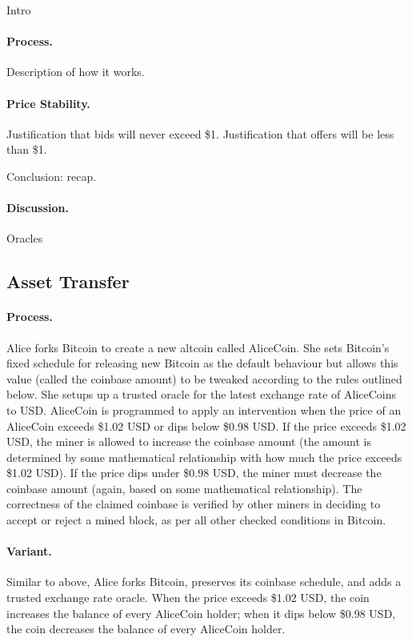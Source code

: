 Intro

\paragraph{Process.} Description of how it works.

\paragraph{Price Stability.} Justification that bids will never exceed \$1. Justification that offers will be less than \$1.

Conclusion: recap.

\paragraph{Discussion.} Oracles


\subsection{Asset Transfer}
\label{sec:basecoin}


\paragraph{Process.} Alice forks Bitcoin to create a new altcoin called AliceCoin. She sets Bitcoin's fixed schedule for releasing new Bitcoin as the default behaviour but allows this value (called the coinbase amount) to be tweaked according to the rules outlined below. She setups up a trusted oracle for the latest exchange rate of AliceCoins to USD. AliceCoin is programmed to apply an intervention when the price of an AliceCoin exceeds \$1.02 USD or dips below \$0.98 USD. If the price exceeds \$1.02 USD, the miner is allowed to increase the coinbase amount (the amount is determined by some mathematical relationship with how much the price exceeds \$1.02 USD). If the price dips under \$0.98 USD, the miner must decrease the coinbase amount (again, based on some mathematical relationship). The correctness of the claimed coinbase is verified by other miners in deciding to accept or reject a mined block, as per all other checked conditions in Bitcoin.

\paragraph{Variant.} Similar to above, Alice forks Bitcoin, preserves its coinbase schedule, and adds a trusted exchange rate oracle. When the price exceeds \$1.02 USD, the coin increases the balance of every AliceCoin holder; when it dips below \$0.98 USD, the coin decreases the balance of every AliceCoin holder.

